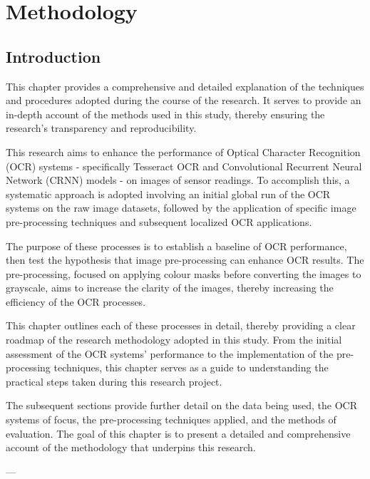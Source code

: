 \chapter{Methodology}
\label{chap:methodology}



\section{Introduction}



This chapter provides a comprehensive and detailed explanation of the techniques and procedures adopted during the course of the research. It serves to provide an in-depth account of the methods used in this study, thereby ensuring the research's transparency and reproducibility.

This research aims to enhance the performance of Optical Character Recognition (OCR) systems - specifically Tesseract OCR and Convolutional Recurrent Neural Network (CRNN) models - on images of sensor readings. To accomplish this, a systematic approach is adopted involving an initial global run of the OCR systems on the raw image datasets, followed by the application of specific image pre-processing techniques and subsequent localized OCR applications.

The purpose of these processes is to establish a baseline of OCR performance, then test the hypothesis that image pre-processing can enhance OCR results. The pre-processing, focused on applying colour masks before converting the images to grayscale, aims to increase the clarity of the images, thereby increasing the efficiency of the OCR processes.

This chapter outlines each of these processes in detail, thereby providing a clear roadmap of the research methodology adopted in this study. From the initial assessment of the OCR systems' performance to the implementation of the pre-processing techniques, this chapter serves as a guide to understanding the practical steps taken during this research project.

The subsequent sections provide further detail on the data being used, the OCR systems of focus, the pre-processing techniques applied, and the methods of evaluation. The goal of this chapter is to present a detailed and comprehensive account of the methodology that underpins this research.

---


